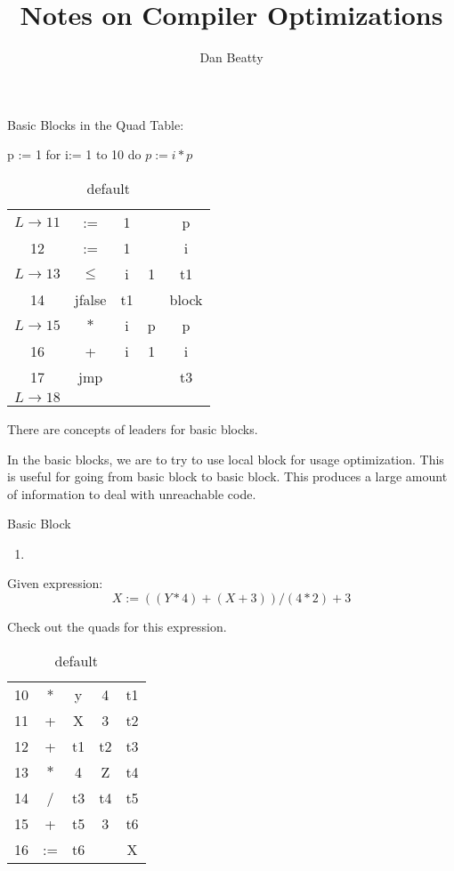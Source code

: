 \documentclass[11pt]{article}
\title{Notes on Compiler Optimizations}
\author{Dan Beatty}
\begin{document}
\maketitle

Basic Blocks in the Quad Table:

p := 1 
for i:= 1 to 10 do 
\hspace{0.5 cm} $p:= i \ast p$


\begin{table}[htdp]
\caption{default}
\begin{center}
\begin{tabular}{|c|c|c|c|c|}
$L \to 11 $& := & 1 & & p \\
12 & := & 1 & & i \\
$L \to 13$ & $\le$ & i & 1 & t1 \\
14 & jfalse & t1 & & block \\
$L \to 15$ & $\ast$ & i & p & p \\
16 & + & i & 1 & i \\
17 & jmp & & & t3 \\
$L \to 18$ &  & & 
\end{tabular}
\end{center}
\label{default}
\end{table}%


There are concepts of leaders for basic blocks. 

In the basic blocks, we are to try to use local block for usage optimization.  This is useful for going from basic block to basic block.  This produces a large amount of information to deal with unreachable code.  

Basic Block 
\begin{enumerate}
\item 
\end{enumerate}
Given expression:
\[X := ((Y \ast 4 ) + (X+3)) / (4 \ast 2 ) +3 \]

Check out the quads for this expression.
\begin{table}[htdp]
\caption{default}
\begin{center}
\begin{tabular}{|c|c|c|c|c|}
10 & * & y & 4 & t1 \\
11 & + & X & 3 & t2\\
12 & + & t1 & t2 & t3 \\
13 & $\ast$ & 4 & Z & t4 \\
14 & / & t3 & t4 & t5 \\
15 & + & t5 & 3 & t6 \\
16 & := & t6 & & X 
\end{tabular}
\end{center}
\label{default}
\end{table}%
\end{document}
